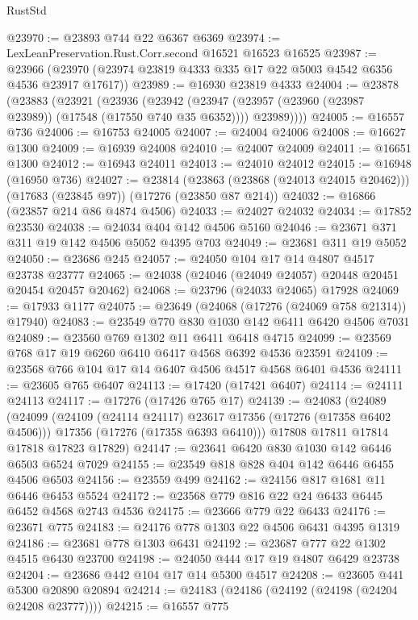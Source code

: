 \begin{lexlean}{RustStd}
\begin{coremodule}
@23970 := @23893 @744 @22 @6367 @6369
@23974 := LexLeanPreservation.Rust.Corr.second @16521 @16523 @16525
@23987 := @23966 (@23970 (@23974 @23819 @4333 @335 @17 @22 @5003 @4542 @6356 @4536 @23917 @17617))
@23989 := @16930 @23819 @4333
@24004 := @23878
    (@23883
      (@23921
        (@23936
          (@23942
            (@23947 (@23957 (@23960 (@23987 @23989)) (@17548 (@17550 @740 @35 @6352))))
            @23989))))
@24005 := @16557 @736
@24006 := @16753 @24005
@24007 := @24004 @24006
@24008 := @16627 @1300
@24009 := @16939 @24008
@24010 := @24007 @24009
@24011 := @16651 @1300
@24012 := @16943 @24011
@24013 := @24010 @24012
@24015 := @16948 (@16950 @736)
@24027 := @23814
    (@23863 (@23868 (@24013 @24015 @20462)))
    (@17683 (@23845 @97))
    (@17276 (@23850 @87 @214))
@24032 := @16866 (@23857 @214 @86 @4874 @4506)
@24033 := @24027 @24032
@24034 := @17852 @23530
@24038 := @24034 @404 @142 @4506 @5160
@24046 := @23671 @371 @311 @19 @142 @4506 @5052 @4395 @703
@24049 := @23681 @311 @19 @5052
@24050 := @23686 @245
@24057 := @24050 @104 @17 @14 @4807 @4517 @23738 @23777
@24065 := @24038 (@24046 (@24049 @24057) @20448 @20451 @20454 @20457 @20462)
@24068 := @23796 (@24033 @24065) @17928
@24069 := @17933 @1177
@24075 := @23649 (@24068 (@17276 (@24069 @758 @21314)) @17940)
@24083 := @23549 @770 @830 @1030 @142 @6411 @6420 @4506 @7031
@24089 := @23560 @769 @1302 @11 @6411 @6418 @4715
@24099 := @23569 @768 @17 @19 @6260 @6410 @6417 @4568 @6392 @4536 @23591
@24109 := @23568 @766 @104 @17 @14 @6407 @4506 @4517 @4568 @6401 @4536
@24111 := @23605 @765 @6407
@24113 := @17420 (@17421 @6407)
@24114 := @24111 @24113
@24117 := @17276 (@17426 @765 @17)
@24139 := @24083
    (@24089
      (@24099
        (@24109 (@24114 @24117) @23617 @17356 (@17276 (@17358 @6402 @4506)))
        @17356
        (@17276 (@17358 @6393 @6410)))
      @17808
      @17811
      @17814
      @17818
      @17823
      @17829)
@24147 := @23641 @6420 @830 @1030 @142 @6446 @6503 @6524 @7029
@24155 := @23549 @818 @828 @404 @142 @6446 @6455 @4506 @6503
@24156 := @23559 @499
@24162 := @24156 @817 @1681 @11 @6446 @6453 @5524
@24172 := @23568 @779 @816 @22 @24 @6433 @6445 @6452 @4568 @2743 @4536
@24175 := @23666 @779 @22 @6433
@24176 := @23671 @775
@24183 := @24176 @778 @1303 @22 @4506 @6431 @4395 @1319
@24186 := @23681 @778 @1303 @6431
@24192 := @23687 @777 @22 @1302 @4515 @6430 @23700
@24198 := @24050 @444 @17 @19 @4807 @6429 @23738
@24204 := @23686 @442 @104 @17 @14 @5300 @4517
@24208 := @23605 @441 @5300 @20890 @20894
@24214 := @24183 (@24186 (@24192 (@24198 (@24204 @24208 @23777))))
@24215 := @16557 @775

\end{coremodule}
\end{lexlean}
